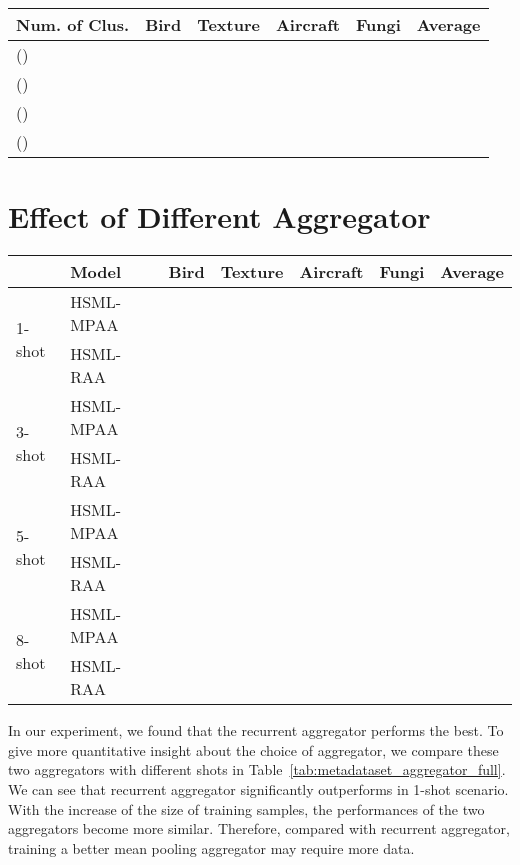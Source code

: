\documentclass{article}
\begin{document}
\begin{table*}[!htbp]
\caption{Comparison of different cluster numbers (Full Table).}
\label{tab:app_cluster_sensitivity}
\begin{center}
\begin{tabular}{l|c|c|c|c|c}
\hline
Num. of Clus. & Bird & Texture & Aircraft & Fungi & Average\\\hline
() &  &  &  &  &  \\
() &  &  &  &  &  \\
() &  &  &  &  &  \\
() &  &  &  &  &  \\\hline

\end{tabular}
\end{center}
\end{table*}


\section{Effect of Different Aggregator}
\begin{table*}[!htbp]
\caption{Comparison of different aggregator on different shot, where HSML-RAA and HSML-MPAA represent HSML with recurrent autoencoder aggregator and mean pooling autoencoder aggregator, respectively.}
\label{tab:metadataset_aggregator_full}
\begin{center}
\begin{tabular}{l|l|c|c|c|c|c}
\hline
& Model & Bird & Texture & Aircraft & Fungi & Average \\\hline
\multirow{2}{*}{1-shot} & HSML-MPAA &  &  &  &  &  \\
& HSML-RAA &  &  &  &  & \\\midrule
\multirow{2}{*}{3-shot} & HSML-MPAA &  &  &  &  &  \\
& HSML-RAA &  &  &  &  & \\\midrule
\multirow{2}{*}{5-shot} & HSML-MPAA &  &  &  &  &  \\
& HSML-RAA &  &  &  &  & \\\midrule
\multirow{2}{*}{8-shot} & HSML-MPAA &  &  &  &  &  \\
& HSML-RAA &  &  &  &  & \\\hline
\end{tabular}
\end{center}
\end{table*}
In our experiment, we found that the recurrent aggregator performs the best. To give more quantitative insight about the choice of aggregator, we compare these two aggregators with different shots in Table~\ref{tab:metadataset_aggregator_full}. We can see that recurrent aggregator significantly outperforms in 1-shot scenario. With the increase of the size of training samples, the performances of the two aggregators become more similar. Therefore, compared with recurrent aggregator, training a better mean pooling aggregator may require more data.
\end{document}
